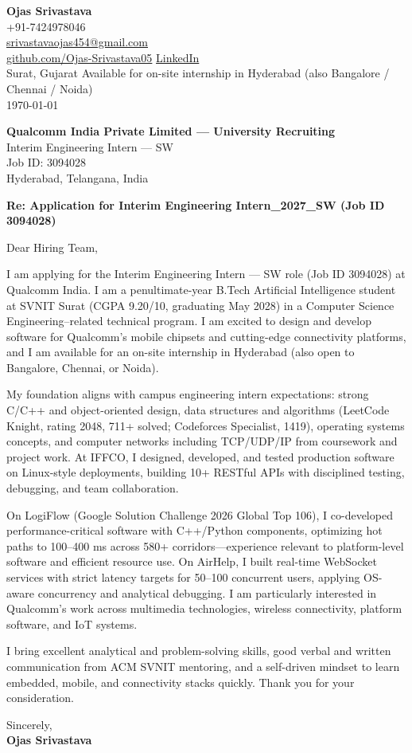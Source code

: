 \documentclass[a4paper,11pt]{article}
\begin{document}
\begin{flushright}
\textbf{Ojas Srivastava} \\
+91-7424978046 \\
\href{mailto:srivastavaojas454@gmail.com}{srivastavaojas454@gmail.com} \\
\href{https://github.com/Ojas-Srivastava05}{github.com/Ojas-Srivastava05} \textbar{}
\href{https://linkedin.com/in/ojas-srivastava05}{LinkedIn} \\
Surat, Gujarat \textbar{} Available for on-site internship in Hyderabad (also Bangalore / Chennai / Noida) \\
\today
\end{flushright}

\vspace{4mm}
\textbf{Qualcomm India Private Limited --- University Recruiting} \\
Interim Engineering Intern --- SW \\
Job ID: 3094028 \\
Hyderabad, Telangana, India

\vspace{2mm}
\textbf{Re: Application for Interim Engineering Intern\_2027\_SW (Job ID 3094028)}

Dear Hiring Team,

I am applying for the Interim Engineering Intern --- SW role (Job ID 3094028) at Qualcomm India. I am a penultimate-year B.Tech Artificial Intelligence student at SVNIT Surat (CGPA 9.20/10, graduating May 2028) in a Computer Science Engineering--related technical program. I am excited to design and develop software for Qualcomm's mobile chipsets and cutting-edge connectivity platforms, and I am available for an on-site internship in Hyderabad (also open to Bangalore, Chennai, or Noida).

My foundation aligns with campus engineering intern expectations: strong C/C++ and object-oriented design, data structures and algorithms (LeetCode Knight, rating 2048, 711+ solved; Codeforces Specialist, 1419), operating systems concepts, and computer networks including TCP/UDP/IP from coursework and project work. At IFFCO, I designed, developed, and tested production software on Linux-style deployments, building 10+ RESTful APIs with disciplined testing, debugging, and team collaboration.

On LogiFlow (Google Solution Challenge 2026 Global Top 106), I co-developed performance-critical software with C++/Python components, optimizing hot paths to 100--400 ms across 580+ corridors---experience relevant to platform-level software and efficient resource use. On AirHelp, I built real-time WebSocket services with strict latency targets for 50--100 concurrent users, applying OS-aware concurrency and analytical debugging. I am particularly interested in Qualcomm's work across multimedia technologies, wireless connectivity, platform software, and IoT systems.

I bring excellent analytical and problem-solving skills, good verbal and written communication from ACM SVNIT mentoring, and a self-driven mindset to learn embedded, mobile, and connectivity stacks quickly. Thank you for your consideration.

Sincerely, \\
\vspace{8mm}
\textbf{Ojas Srivastava}
\end{document}
